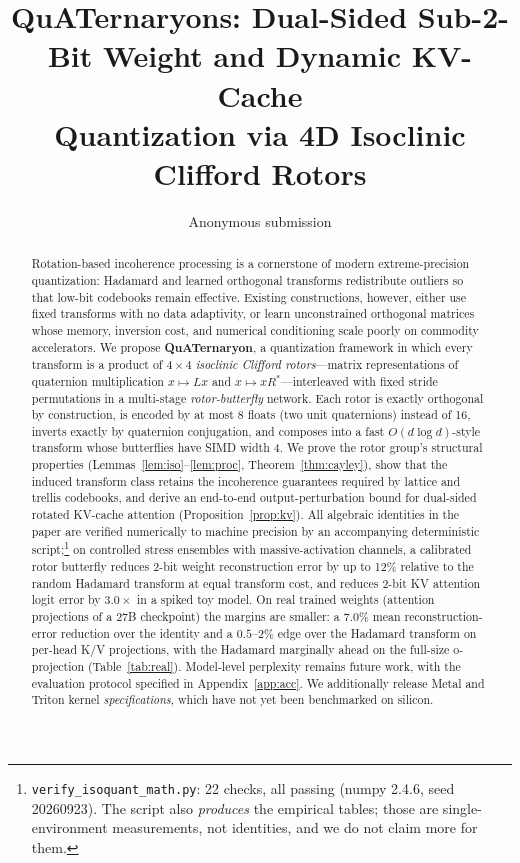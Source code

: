 \documentclass{article}
\title{QuATernaryons: Dual-Sided Sub-2-Bit Weight and Dynamic KV-Cache\\
Quantization via 4D Isoclinic Clifford Rotors}
\author{%
  Anonymous submission\\
}
\date{}
\begin{document}
\maketitle

\begin{abstract}
Rotation-based incoherence processing is a cornerstone of modern extreme-precision
quantization: Hadamard and learned orthogonal transforms redistribute outliers so
that low-bit codebooks remain effective. Existing constructions, however, either
use fixed transforms with no data adaptivity, or learn unconstrained orthogonal
matrices whose memory, inversion cost, and numerical conditioning scale poorly on
commodity accelerators. We propose \textbf{QuATernaryon}, a quantization
framework in which every transform is a product of $4\times4$
\emph{isoclinic Clifford rotors}---matrix representations of quaternion
multiplication $x\mapsto Lx$ and $x\mapsto xR^{*}$---interleaved with fixed
stride permutations in a multi-stage \emph{rotor-butterfly} network. Each rotor
is exactly orthogonal by construction, is encoded by at most 8 floats (two unit
quaternions) instead of 16, inverts exactly by quaternion conjugation, and
composes into a fast $O(d\log d)$-style transform whose butterflies have SIMD
width 4. We prove the rotor group's structural properties
(Lemmas~\ref{lem:iso}--\ref{lem:proc}, Theorem~\ref{thm:cayley}), show that the
induced transform class retains the incoherence guarantees required by
lattice and trellis codebooks, and derive an end-to-end output-perturbation
bound for dual-sided rotated KV-cache attention
(Proposition~\ref{prop:kv}). All algebraic identities in the paper are
verified numerically to machine precision by an accompanying deterministic
script;\footnote{\texttt{verify\_isoquant\_math.py}: 22 checks, all passing
(numpy 2.4.6, seed 20260923). The script also \emph{produces} the empirical
tables; those are single-environment measurements, not identities, and we do
not claim more for them.}
on controlled stress ensembles with massive-activation channels, a calibrated
rotor butterfly reduces 2-bit weight reconstruction error by up to 12\%
relative to the random Hadamard transform at equal transform cost, and reduces
2-bit KV attention logit error by $3.0\times$ in a spiked toy model. On real
trained weights (attention projections of a 27B checkpoint) the margins are
smaller: a $7.0\%$ mean reconstruction-error reduction over the identity and a
$0.5$--$2\%$ edge over the Hadamard transform on per-head K/V projections, with
the Hadamard marginally ahead on the full-size o-projection (Table~\ref{tab:real}).
Model-level perplexity remains future work, with the evaluation protocol
specified in Appendix~\ref{app:acc}. We additionally release Metal and Triton
kernel \emph{specifications}, which have not yet been benchmarked on silicon.
\end{abstract}
\end{document}
